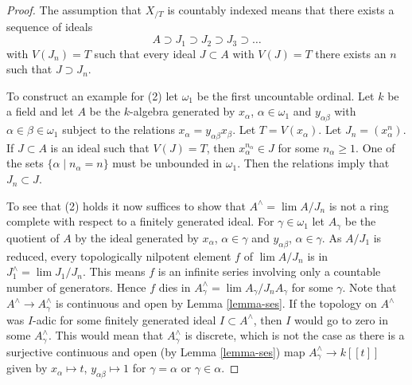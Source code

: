 \begin{proof}
The assumption that $X_{/T}$ is countably indexed means that there exists a
sequence of ideals
$$
A \supset J_1 \supset J_2 \supset J_3 \supset \ldots
$$
with $V(J_n) = T$ such that every ideal $J \subset A$ with $V(J) = T$
there exists an $n$ such that $J \supset J_n$.

\medskip\noindent
To construct an example for (2) let $\omega_1$ be the first uncountable
ordinal. Let $k$ be a field and let
$A$ be the $k$-algebra generated by $x_\alpha$, $\alpha \in \omega_1$
and $y_{\alpha \beta}$ with $\alpha \in \beta \in \omega_1$
subject to the relations $x_\alpha = y_{\alpha \beta} x_\beta$.
Let $T = V(x_\alpha)$. Let $J_n = (x_\alpha^n)$.
If $J \subset A$ is an ideal such that
$V(J) = T$, then $x_\alpha^{n_\alpha} \in J$ for some $n_\alpha \geq 1$.
One of the sets $\{\alpha \mid n_\alpha = n\}$ must be unbounded in
$\omega_1$. Then the relations imply that $J_n \subset J$.

\medskip\noindent
To see that (2) holds it now suffices to show that $A^\wedge = \lim A/J_n$
is not a ring complete with respect to a finitely generated ideal.
For $\gamma \in \omega_1$ let $A_\gamma$ be the quotient of $A$
by the ideal generated by $x_\alpha$, $\alpha \in \gamma$ and
$y_{\alpha \beta}$, $\alpha \in \gamma$. As $A/J_1$ is reduced,
every topologically nilpotent element $f$ of $\lim A/J_n$ is in
$J_1^\wedge = \lim J_1/J_n$. This means $f$ is an infinite series
involving only a countable number of generators. Hence $f$ dies in
$A_\gamma^\wedge = \lim A_\gamma/J_nA_\gamma$ for some $\gamma$.
Note that $A^\wedge \to A_\gamma^\wedge$ is continuous and open by
Lemma \ref{lemma-ses}.
If the topology on $A^\wedge$ was $I$-adic for some finitely generated ideal
$I \subset A^\wedge$, then $I$ would go to zero in some
$A_\gamma^\wedge$. This would mean that $A_\gamma^\wedge$ is discrete,
which is not the case as there is a surjective continuous and open
(by Lemma \ref{lemma-ses}) map
$A_\gamma^\wedge \to k[[t]]$ given by
$x_\alpha \mapsto t$, $y_{\alpha \beta} \mapsto 1$ for
$\gamma = \alpha$ or $\gamma \in \alpha$.


\end{proof}
